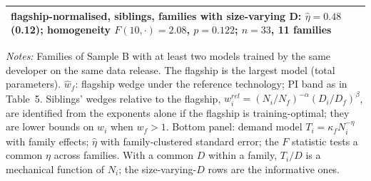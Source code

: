 \begin{table}[htbp]
\begin{threeparttable}
\begin{tabular}{@{}lcccccccc c@{}}
\multicolumn{10}{l}{flagship-normalised, siblings, families with size-varying D: $\hat\eta=0.48$ (0.12); homogeneity $F(10,\cdot)=2.08$, $p=0.122$; $n=33$, 11 families} \\
\bottomrule
\end{tabular}
\begin{tablenotes}\footnotesize
\item \textit{Notes:} Families of Sample B with at least two models trained by the same developer on the same data release. The flagship is the largest model (total parameters). $\hat w_f$: flagship wedge under the reference technology; PI band as in Table~5. Siblings' wedges relative to the flagship, $w^{rel}_i=(N_i/N_f)^{-\alpha}(D_i/D_f)^{\beta}$, are identified from the exponents alone if the flagship is training-optimal; they are lower bounds on $w_i$ when $w_f>1$. Bottom panel: demand model $T_i=\kappa_f N_i^{-\eta}$ with family effects; $\hat\eta$ with family-clustered standard error; the $F$ statistic tests a common $\eta$ across families. With a common $D$ within a family, $T_i/D$ is a mechanical function of $N_i$; the size-varying-$D$ rows are the informative ones.
\end{tablenotes}
\end{threeparttable}
\end{table}
